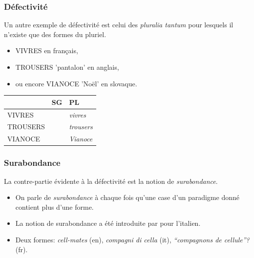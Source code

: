 \begin{frame}
\frametitle{Défectivité}


\vspace{2ex}
Un autre exemple de défectivité est celui des {\em pluralia tantum}
pour lesquels il n'existe que des formes du pluriel.
\begin{itemize}
\item {\scriptsize{VIVRES}} en français,
\item {\scriptsize{TROUSERS}} 'pantalon' en anglais,
\item ou encore {\scriptsize{VIANOCE}} 'Noël' en slovaque.
\end{itemize}

\vspace{2ex}

\footnotesize
\begin{tabular}{lll}
&{\scriptsize{SG}}&{\scriptsize{PL}}\\
\hline
{\scriptsize{VIVRES}}&\cellcolor{black}&{\em vivres}\\[1ex]
{\scriptsize{TROUSERS}}&\cellcolor{black}&{\em trousers}\\[1ex]
{\scriptsize{VIANOCE}}&\cellcolor{black}&{\em Vianoce}\\[1ex]
\end{tabular}


\end{frame}




\begin{frame}
\frametitle{Surabondance}
La contre-partie évidente à la défectivité est la notion de {\em
  surabondance}. 
\begin{itemize}
\item On parle de {\em surabondance} à chaque fois qu'une
case d'un paradigme donné contient plus d'une forme.
\item La notion de
surabondance a été introduite par \cite{thornton10} pour
l'italien.
\item Deux formes: {\em cell-mates} (en), {\em compagni di cella} (it),{\em
    ``compagnons de cellule''?} (fr).
\end{itemize}

\pause
\begin{table}\centering
{}
\label{tbl:italian}
\end{table}
\end{frame}


